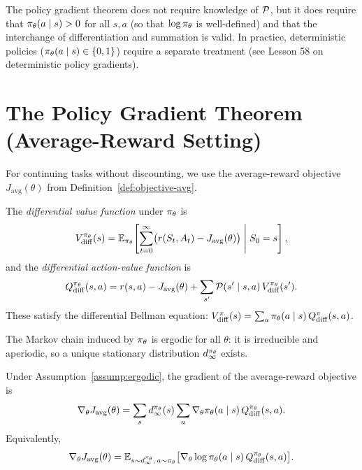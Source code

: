 \documentclass[11pt,a4paper]{article}
\begin{document}
\begin{warning}[title={Model-Free, Not Assumption-Free}]
The policy gradient theorem does not require knowledge of $\mathcal{P}$, but
it does require that $\pi_\theta(a \mid s) > 0$ for all $s, a$ (so
that $\log \pi_\theta$ is well-defined) and that the interchange of
differentiation and summation is valid. In practice, deterministic policies
($\pi_\theta(a \mid s) \in \{0,1\}$) require a separate treatment
(see Lesson 58 on deterministic policy gradients).
\end{warning}

\section{The Policy Gradient Theorem (Average-Reward Setting)}

For continuing tasks without discounting, we use the average-reward
objective $J_{\mathrm{avg}}(\theta)$ from Definition~\ref{def:objective-avg}.

\begin{definition}
\label{def:diff-value}
The \emph{differential value function} under $\pi_\theta$ is
\[
  V^{\pi_\theta}_{\mathrm{diff}}(s)
  = \mathbb{E}_{\pi_\theta}\!\left[\sum_{t=0}^{\infty}
    \bigl(r(S_t, A_t) - J_{\mathrm{avg}}(\theta)\bigr)
    \;\middle|\; S_0 = s\right],
\]
and the \emph{differential action-value function} is
\[
  Q^{\pi_\theta}_{\mathrm{diff}}(s,a)
  = r(s,a) - J_{\mathrm{avg}}(\theta)
    + \sum_{s'} \mathcal{P}(s' \mid s,a)\,
    V^{\pi_\theta}_{\mathrm{diff}}(s').
\]
These satisfy the differential Bellman equation:
$V^{\pi}_{\mathrm{diff}}(s) = \sum_a \pi_\theta(a \mid s)\,
Q^{\pi}_{\mathrm{diff}}(s,a)$.
\end{definition}

\begin{assumption}
\label{assump:ergodic}
The Markov chain induced by $\pi_\theta$ is ergodic for all $\theta$:
it is irreducible and aperiodic, so a unique stationary distribution
$d^{\pi_\theta}_{\infty}$ exists.
\end{assumption}

\begin{theorem}
\label{thm:pg-avg}
Under Assumption~\ref{assump:ergodic}, the gradient of the average-reward
objective is
\[
  \nabla_\theta J_{\mathrm{avg}}(\theta)
  = \sum_s d^{\pi_\theta}_{\infty}(s)
    \sum_a \nabla_\theta \pi_\theta(a \mid s)\,
    Q^{\pi_\theta}_{\mathrm{diff}}(s,a).
\]
Equivalently,
\[
  \nabla_\theta J_{\mathrm{avg}}(\theta)
  = \mathbb{E}_{s \sim d^{\pi_\theta}_{\infty},\, a \sim \pi_\theta}
    \bigl[\nabla_\theta \log \pi_\theta(a \mid s)\,
    Q^{\pi_\theta}_{\mathrm{diff}}(s,a)\bigr].
\]
\end{theorem}
\end{document}

